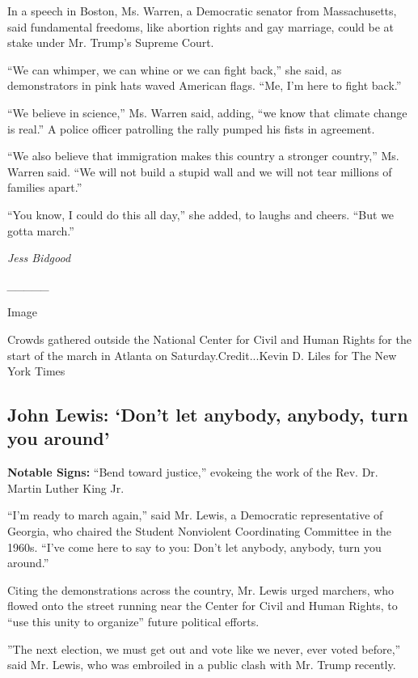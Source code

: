 In a speech in Boston, Ms. Warren, a Democratic senator from
Massachusetts, said fundamental freedoms, like abortion rights and gay
marriage, could be at stake under Mr. Trump's Supreme Court.

``We can whimper, we can whine or we can fight back,'' she said, as
demonstrators in pink hats waved American flags. ``Me, I'm here to fight
back.''

``We believe in science,'' Ms. Warren said, adding, ``we know that
climate change is real.'' A police officer patrolling the rally pumped
his fists in agreement.

``We also believe that immigration makes this country a stronger
country,'' Ms. Warren said. ``We will not build a stupid wall and we
will not tear millions of families apart.''

``You know, I could do this all day,'' she added, to laughs and cheers.
``But we gotta march.''

\emph{Jess Bidgood}

\emph{\_\_\_\_\_}

Image

Crowds gathered outside the National Center for Civil and Human Rights
for the start of the march in Atlanta on Saturday.Credit...Kevin D.
Liles for The New York Times

\hypertarget{john-lewis-dont-let-anybody-anybody-turn-you-around}{%
\subsection{John Lewis: `Don't let anybody, anybody, turn you
around'}\label{john-lewis-dont-let-anybody-anybody-turn-you-around}}

\textbf{Notable Signs:} ``Bend toward justice,'' evokeing the work of
the Rev. Dr. Martin Luther King Jr.

``I'm ready to march again,'' said Mr. Lewis, a Democratic
representative of Georgia, who chaired the Student Nonviolent
Coordinating Committee in the 1960s. ``I've come here to say to you:
Don't let anybody, anybody, turn you around.''

Citing the demonstrations across the country, Mr. Lewis urged marchers,
who flowed onto the street running near the Center for Civil and Human
Rights, to ``use this unity to organize'' future political efforts.

''The next election, we must get out and vote like we never, ever voted
before,'' said Mr. Lewis, who was embroiled in a public clash with Mr.
Trump recently.

